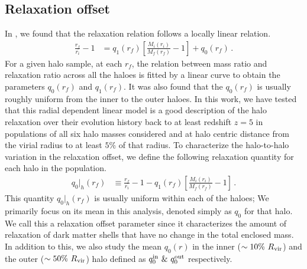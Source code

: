 \subsection{Relaxation offset}
In , we found that the relaxation relation follows a locally linear relation. 
\begin{align}
    \label{eq:chi-linear-q0}
    \frac{r_f}{r_i} - 1 &= q_1(r_f) \left[ \frac{M_i(r_i)}{M_f(r_f)} - 1 \right] + q_0(r_f)\,.
\end{align}
For a given halo sample, at each $r_f$, the relation between mass ratio and relaxation ratio across all the haloes is fitted by a linear curve to obtain the parameters $q_0(r_f)$ and $q_1(r_f)$. It was also found that the $q_0(r_f)$ is usually roughly uniform from the inner to the outer haloes. In this work, we have tested that this radial dependent linear model is a good description of the halo relaxation over their evolution history back to at least redshift $z=5$ in populations of all six halo masses considered and at halo centric distance from the virial radius to at least $5 \%$ of that radius. To characterize the halo-to-halo variation in the relaxation offset, we define the following relaxation quantity for each halo in the population. 
\begin{align}
\label{eq:def-q0hal}
q_0 |_{h}(r_f) &\equiv \frac{r_f}{r_i} - 1 - q_1(r_f) \left[ \frac{M_i(r_i)}{M_f(r_f)} - 1 \right]\,.
\end{align}
This quantity $q_0 |_{h}(r_f)$ is usually uniform within each of the haloes; We primarily focus on its mean in this analysis, denoted simply as $q_0$ for that halo. We call this a relaxation offset parameter since it characterizes the amount of relaxation of dark matter shells that have no change in the total enclosed mass. In addition to this, we also study the mean $q_0(r)$ in the inner ($\sim 10\%~R_{\rm{vir}}$) and the outer ($\sim 50\%~R_{\rm{vir}}$) halo defined as $q_0^{\rm{in}} ~\& ~q_0^{\rm{out}}$ respectively.

